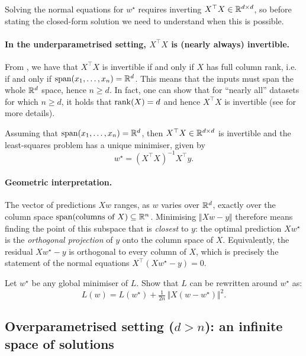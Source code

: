 Solving the normal equations for $w^\star$ requires inverting $X^\top X \in
\mathbb{R}^{d\times d}$, so before stating the closed-form solution we need to
understand when this is possible.

\paragraph{In the underparametrised setting, $X^\top X$ is (nearly always) invertible.}
From , we have that $X^\top X$ is invertible if and only if $X$ has full column rank, i.e. if and only if $\operatorname{span}(x_1, \dots, x_n) = \mathbb{R}^d$. This means that the inputs must span the whole $\mathbb{R}^d$ space, hence $n \geq d$. In fact, one can show that for ``nearly all'' datasets for which $n \geq d$, it holds that $\operatorname{rank}(X) = d$ and hence $X^\top X$ is invertible (see  for more details). 

\begin{prop}\label{prop:closed-form-LS}
Assuming that $\operatorname{span}(x_1, \dots, x_n) = \mathbb{R}^d$, then $X^\top X \in \mathbb{R}^{d \times d}$ is invertible and the least-squares problem
has a unique minimiser, given by
\[
w^\star = (X^\top X)^{-1} X^\top y .
\]
\end{prop}

\paragraph{Geometric interpretation.}
The vector of predictions $X w$ ranges, as $w$ varies over $\mathbb{R}^d$, exactly over
the column space $\operatorname{span}(\text{columns of } X) \subseteq \mathbb{R}^n$. Minimising
$\Vert Xw - y\Vert$ therefore means finding the point of this subspace that is
\emph{closest} to $y$: the optimal prediction $X w^\star$ is the
\emph{orthogonal projection} of $y$ onto the column space of $X$.
Equivalently, the residual $X w^\star - y$ is orthogonal to every column of
$X$, which is precisely the statement of the normal equations
$X^\top (X w^\star - y) = 0$.


\begin{exercise}[$\star\star$]
Let $w^\star$ be any global minimiser of $L$. Show that $L$ can be rewritten around $w^\star$ as:
\[
L(w) = L(w^\star) + \tfrac{1}{2n}\, \big\Vert X (w - w^\star) \big\Vert^2.
\]
\end{exercise}




\subsection{Overparametrised setting ($d > n$): an infinite space of solutions}
\label{subsec:overparam}

